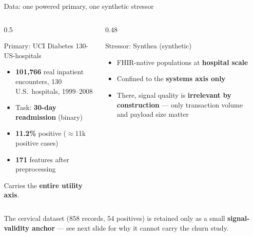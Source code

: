 \documentclass[aspectratio=169, 11pt]{beamer}
\begin{document}
\begin{frame}{Data: one powered primary, one synthetic stressor}
\begin{columns}[T]
\begin{column}{0.5\textwidth}
\begin{exampleblock}{Primary: UCI Diabetes 130-US-hospitals}
\begin{itemize}\small
\item \textbf{101,766} real inpatient encounters, 130 U.S.\ hospitals,
      1999--2008
\item Task: \textbf{30-day readmission} (binary)
\item \textbf{11.2\%} positive ($\approx$11k positive cases)
\item \textbf{171} features after preprocessing
\end{itemize}
Carries the \textbf{entire utility axis}.
\end{exampleblock}
\end{column}
\begin{column}{0.48\textwidth}
\begin{block}{Stressor: Synthea (synthetic)}
\begin{itemize}\small
\item FHIR-native populations at \textbf{hospital scale}
\item Confined to the \textbf{systems axis only}
\item There, signal quality is \textbf{irrelevant by construction} --- only
      transaction volume and payload size matter
\end{itemize}
\end{block}
\end{column}
\end{columns}
\vspace{0.5em}
{\footnotesize The cervical dataset (858 records, 54 positives) is retained
only as a small \textbf{signal-validity anchor} --- see next slide for why it
cannot carry the churn study.}
\end{frame}
\end{document}
